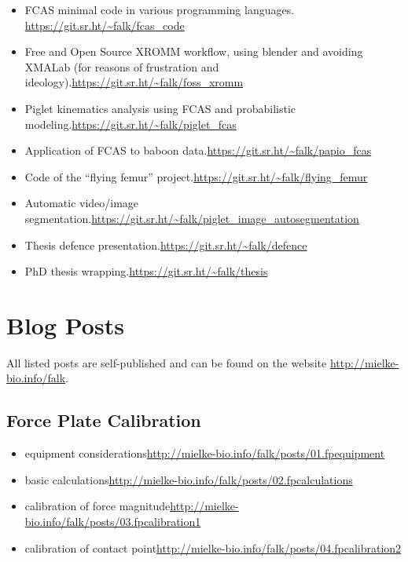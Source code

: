 \begin{change}
\begin{itemize}
\item FCAS minimal code in various programming languages. \newline \url{https://git.sr.ht/\~falk/fcas\_code}
\item Free and Open Source XROMM workflow, using blender and avoiding XMALab (for reasons of frustration and ideology).\newline \url{https://git.sr.ht/\~falk/foss\_xromm}
\item Piglet kinematics analysis using FCAS and probabilistic modeling.\newline \url{https://git.sr.ht/\~falk/piglet\_fcas}
\item Application of FCAS to baboon data.\newline \url{https://git.sr.ht/\~falk/papio\_fcas}
\item Code of the ``flying femur'' project.\newline \url{https://git.sr.ht/\~falk/flying\_femur}
\item Automatic video/image segmentation.\newline \url{https://git.sr.ht/\~falk/piglet\_image\_autosegmentation}
\item Thesis defence presentation.\newline \url{https://git.sr.ht/\~falk/defence}
\item PhD thesis wrapping.\newline \url{https://git.sr.ht/\~falk/thesis}
\end{itemize}
\section{Blog Posts}
\label{sec:orgfc9a434}
All listed posts are self-published and can be found on the website \url{http://mielke-bio.info/falk}.
\subsection{Force Plate Calibration}
\label{sec:org4b744c2}
\begin{itemize}
\item equipment considerations\newline \url{http://mielke-bio.info/falk/posts/01.fpequipment}
\item basic calculations\newline \url{http://mielke-bio.info/falk/posts/02.fpcalculations}
\item calibration of force magnitude\newline \url{http://mielke-bio.info/falk/posts/03.fpcalibration1}
\item calibration of contact point\newline \url{http://mielke-bio.info/falk/posts/04.fpcalibration2}
\end{itemize}

\end{change}
